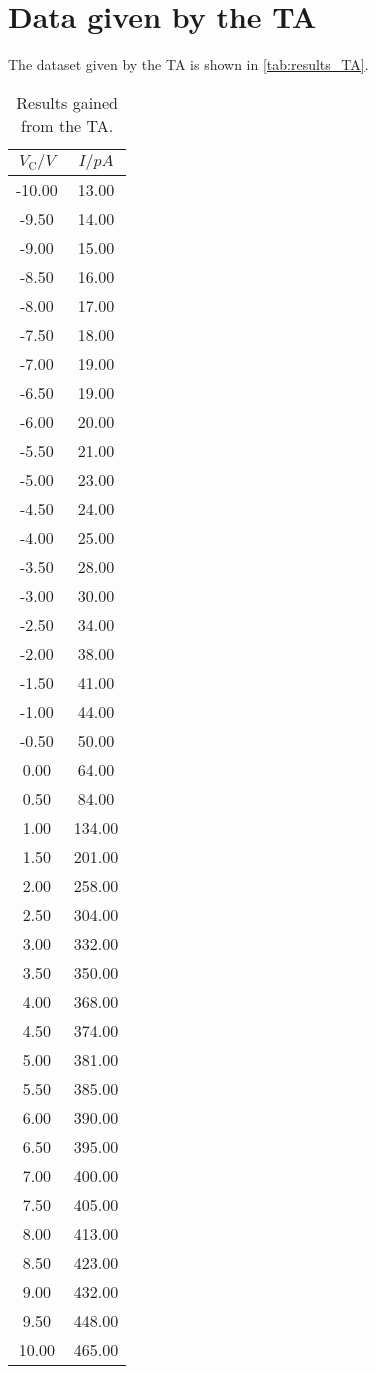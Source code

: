 \section{Data given by the TA}
\label{sec:appendix:TA}
The dataset given by the TA is shown in \autoref{tab:results_TA}.
\begin{table*}
  \centering
  \caption{Results gained from the TA.}
  \label{tab:results_TA}
  \begin{tabular}{c c}
    $V_\text{C} / \si{V}$ &
    $I / \si{pA}$ \\
    \hline
    -10.00&13.00 \\
    -9.50&14.00 \\
    -9.00&15.00 \\
    -8.50&16.00 \\
    -8.00&17.00 \\
    -7.50&18.00 \\
    -7.00&19.00 \\
    -6.50&19.00 \\
    -6.00&20.00 \\
    -5.50&21.00 \\
    -5.00&23.00 \\
    -4.50&24.00 \\
    -4.00&25.00 \\
    -3.50&28.00 \\
    -3.00&30.00 \\
    -2.50&34.00 \\
    -2.00&38.00 \\
    -1.50&41.00 \\
    -1.00&44.00 \\
    -0.50&50.00 \\
    0.00&64.00 \\
    0.50&84.00 \\
    1.00&134.00 \\
    1.50&201.00 \\
    2.00&258.00 \\
    2.50&304.00 \\
    3.00&332.00 \\
    3.50&350.00 \\
    4.00&368.00 \\
    4.50&374.00 \\
    5.00&381.00 \\
    5.50&385.00 \\
    6.00&390.00 \\
    6.50&395.00 \\
    7.00&400.00 \\
    7.50&405.00 \\
    8.00&413.00 \\
    8.50&423.00 \\
    9.00&432.00 \\
    9.50&448.00 \\
    10.00&465.00 \\
  \end{tabular}
\end{table*}
